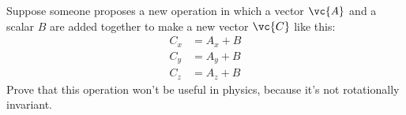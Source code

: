 Suppose someone proposes a new operation in which a vector $\vc{A}$ and
a scalar $B$ are added together to make a new vector $\vc{C}$ like this:
\begin{align*}
  C_x &= A_x + B \\
  C_y &= A_y + B \\
  C_z &= A_z + B 
\end{align*}
Prove that this operation won't be useful in physics, because it's not
rotationally invariant. 
